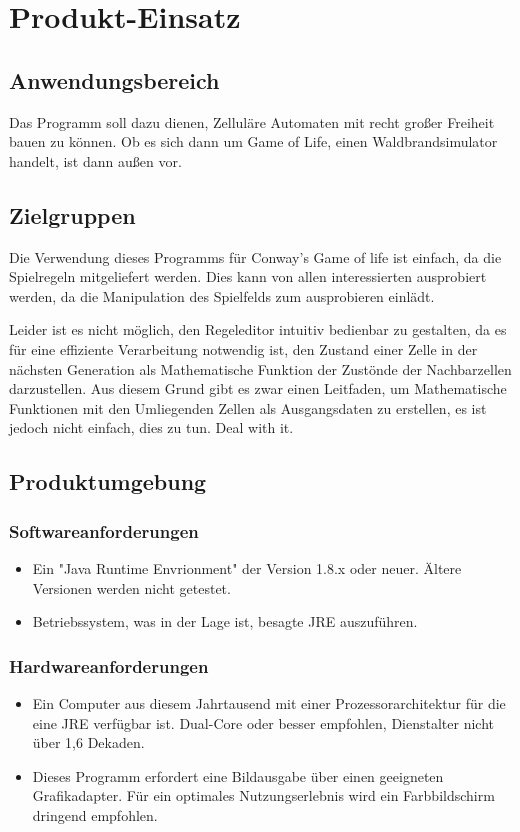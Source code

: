\documentclass[11pt,a4paper]{article}
\begin{document}
\pagebreak
\section{Produkt-Einsatz}
\subsection{Anwendungsbereich}
Das Programm soll dazu dienen, Zelluläre Automaten mit recht großer Freiheit bauen zu können. Ob es sich dann um Game of Life, einen Waldbrandsimulator handelt, ist dann außen vor.
\subsection{Zielgruppen}
Die Verwendung dieses Programms für Conway's Game of life ist einfach, da die Spielregeln mitgeliefert werden. Dies kann von allen interessierten ausprobiert werden, da die Manipulation des Spielfelds zum ausprobieren einlädt.

Leider ist es nicht möglich, den Regeleditor intuitiv bedienbar zu gestalten, da es für eine effiziente Verarbeitung notwendig ist, den Zustand einer Zelle in der nächsten Generation als Mathematische Funktion der Zustönde der Nachbarzellen darzustellen. Aus diesem Grund gibt es zwar einen Leitfaden, um Mathematische Funktionen mit den Umliegenden Zellen als Ausgangsdaten zu erstellen, es ist jedoch nicht einfach, dies zu tun. Deal with it.


\subsection{Produktumgebung}


\subsubsection{Softwareanforderungen}
\begin{itemize}
    \item Ein "Java Runtime Envrionment" der Version 1.8.x oder neuer. Ältere Versionen werden nicht getestet.
    \item Betriebssystem, was in der Lage ist, besagte JRE auszuführen. 
\end{itemize}

\subsubsection{Hardwareanforderungen}


\begin{itemize}
    \item Ein Computer aus diesem Jahrtausend mit einer Prozessorarchitektur für die eine JRE verfügbar ist. Dual-Core oder besser empfohlen, Dienstalter nicht über 1,6 Dekaden.
	\item Dieses Programm erfordert eine Bildausgabe über einen geeigneten Grafikadapter. Für ein optimales Nutzungserlebnis wird ein Farbbildschirm dringend empfohlen.
\end{itemize}
\end{document}
